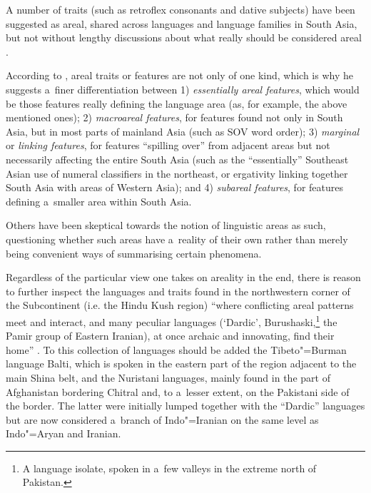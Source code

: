 A number of traits (such as retroflex consonants and dative subjects) have been suggested as areal, shared across languages and language families in South Asia, but not without lengthy discussions about what really should be considered areal \citep{emeneau1965,emeneau1980,masica1976,masica1991,masica2001,ebert2006}.


According to \citet{masica2001}, areal traits or features are not only of one kind, which is why he suggests a~finer differentiation between 1) \textit{essentially areal features}, which would be those features really defining the language area (as, for example, the above mentioned ones); 2) \textit{macroareal features}, for features found not only in South Asia, but in most parts of mainland Asia (such as SOV word order); 3) \textit{marginal} or \textit{linking features}, for features ``spilling over'' from adjacent areas but not necessarily affecting the entire South Asia (such as the ``essentially'' Southeast Asian use of numeral classifiers in the northeast, or ergativity linking together South Asia with areas of Western Asia); and 4) \textit{subareal features}, for features defining a~smaller area within South Asia.


Others \citep{dahl2001,ktammwaelchli2001} have been skeptical towards the notion of linguistic areas as such, questioning whether such areas have a~reality of their own rather than merely being convenient ways of summarising certain phenomena. 


Regardless of the particular view one takes on areality in the end, there is reason to further inspect the languages and traits found in the northwestern corner of the Subcontinent (i.e. the Hindu Kush region) ``where conflicting areal patterns meet and interact, and many peculiar languages (`Dardic', Burushaski,\footnote{A language isolate, spoken in a~few valleys in the extreme north of Pakistan.} the Pamir group of Eastern Iranian), at once archaic and innovating, find their home'' \citep[225]{masica2001}. To this collection of languages should be added the Tibeto"=Burman language Balti, which is spoken in the eastern part of the region adjacent to the main Shina belt, and the Nuristani languages, mainly found in the part of Afghanistan bordering Chitral and, to a~lesser extent, on the Pakistani side of the border. The latter were initially lumped together with the ``Dardic'' languages but are now considered a~branch of Indo"=Iranian on the same level as Indo"=Aryan and Iranian.


